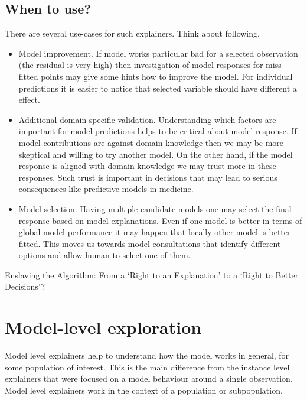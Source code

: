 \documentclass[12pt,]{krantz}
\providecommand{\tightlist}{%
  \setlength{\itemsep}{0pt}\setlength{\parskip}{0pt}}
\theoremstyle{definition}
\theoremstyle{definition}
\theoremstyle{definition}
\theoremstyle{remark}
\begin{document}
\hypertarget{when-to-use}{%
\subsection{When to use?}\label{when-to-use}}

There are several use-cases for such explainers. Think about following.

\begin{itemize}
\tightlist
\item
  Model improvement. If model works particular bad for a selected
  observation (the residual is very high) then investigation of model
  responses for miss fitted points may give some hints how to improve
  the model. For individual predictions it is easier to notice that
  selected variable should have different a effect.
\item
  Additional domain specific validation. Understanding which factors are
  important for model predictions helps to be critical about model
  response. If model contributions are against domain knowledge then we
  may be more skeptical and willing to try another model. On the other
  hand, if the model response is aligned with domain knowledge we may
  trust more in these responses. Such trust is important in decisions
  that may lead to serious consequences like predictive models in
  medicine.
\item
  Model selection. Having multiple candidate models one may select the
  final response based on model explanations. Even if one model is
  better in terms of global model performance it may happen that locally
  other model is better fitted. This moves us towards model
  consultations that identify different options and allow human to
  select one of them.
\end{itemize}

Enslaving the Algorithm: From a `Right to an Explanation' to a `Right to
Better Decisions'? \citep{Edwards_Veale_2018}

\hypertarget{modelLevelExploration}{%
\section{Model-level exploration}\label{modelLevelExploration}}

Model level explainers help to understand how the model works in
general, for some population of interest. This is the main difference
from the instance level explainers that were focused on a model
behaviour around a single observation. Model level explainers work in
the context of a population or subpopulation.
\end{document}
